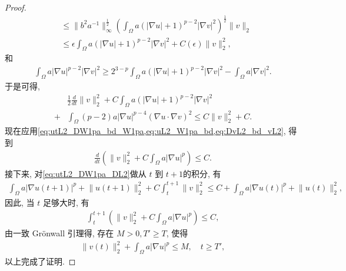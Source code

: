 \documentclass[oneside,longtitle]{LZUthesis}
\numberwithin{equation}{chapter}
\newcommand*\abs[1]{\lvert#1\rvert}
\newcommand*\norm[1]{\lVert#1\rVert}
\begin{document}
\begin{proof}
\begin{equation*}
\begin{split}
			&\leq \norm{b^2 a^{-1}}_{\infty}^{\frac{1}{2}}
			\left(\int_{\Omega}a\left(\abs{\nabla u}+1\right)^{p-2}\abs{\nabla v}^2\right)^{\frac{1}{2}}\norm{v}_2\\
			&\leq \epsilon \int_{\Omega}a\left(\abs{\nabla u}+1\right)^{p-2}\abs{\nabla v}^2
			+ C(\epsilon) \norm{v}_2^2,
		\end{split}
	\end{equation*}
	和
	\begin{equation*}
		\begin{split}
			\int_{\Omega}a\abs{\nabla u}^{p-2}\abs{\nabla v}^2
			\geq 2^{3-p}\int_{\Omega}a\left(\abs{\nabla u}+1\right)^{p-2}\abs{\nabla v}^2
			- \int_{\Omega}a\abs{\nabla v}^2.
		\end{split}
	\end{equation*}
	于是可得,
	\begin{equation}\label{eq:DvL2_bd_vL2}
		\begin{split}
			& \frac{1}{2}\frac{d}{dt}\norm{v}_2^2
			+ C\int_{\Omega}a\left(\abs{\nabla u}+1\right)^{p-2}\abs{\nabla v}^2\\
			+{} & \int_{\Omega}\left(p-2\right)a\abs{\nabla u}^{p-4}\left(\nabla u
			\cdot \nabla v\right)^2
			\leq C\norm{v}_2^2 + C.
		\end{split}
	\end{equation}
	现在应用\cref{eq:utL2_DW1pa_bd_W1pa,eq:uL2_W1pa_bd,eq:DvL2_bd_vL2},
	得到
	\begin{equation*}
		\begin{split}
			\frac{d}{dt}\left(
			\norm{v}_2^2 + C\int_{\Omega}a\abs{\nabla u}^p
			\right)
			\leq C.
		\end{split}
	\end{equation*}
	接下来, 对\cref{eq:utL2_DW1pa_DL2}做从 $t$ 到 $t+1$的积分, 有
	\begin{equation*}
		\begin{split}
			\int_{\Omega}a\abs{\nabla u(t+1)}^p
			+ \norm{u(t+1)}_2^2
			+ C\int_t^{t+1}\norm{v}_2^2
			\leq C + \int_{\Omega}a\abs{\nabla u(t)}^p
			+ \norm{u(t)}_2^2,
		\end{split}
	\end{equation*}
	因此, 当 $t$ 足够大时, 有
	\begin{equation*}
		\begin{split}
			\int_t^{t+1}\left(
			\norm{v}_2^2 + C\int_{\Omega}a\abs{\nabla u}^p
			\right) \leq C,
		\end{split}
	\end{equation*}
	由一致 Gr\"onwall 引理得, 存在 $M > 0, T' \geq T$, 使得
	\begin{equation*}
		\begin{split}
			\norm{v(t)}_2^2
			+ \int_{\Omega}a\abs{\nabla u}^p \leq M , \quad t \geq T',
		\end{split}
	\end{equation*}
	以上完成了证明.
\end{proof}
\end{document}
